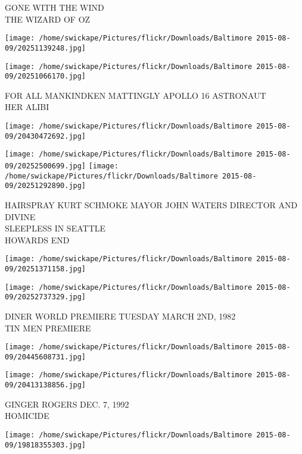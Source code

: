 \documentclass[10pt,letterpaper]{article}
\begin{document}
GONE WITH THE WIND\\
THE WIZARD OF OZ\\
\pagebreak

\texttt{[image: /home/swickape/Pictures/flickr/Downloads/Baltimore 2015-08-09/20251139248.jpg]}

\vspace{0.25in}
\texttt{[image: /home/swickape/Pictures/flickr/Downloads/Baltimore 2015-08-09/20251066170.jpg]}

FOR ALL MANKINDKEN MATTINGLY APOLLO 16 ASTRONAUT\\
HER ALIBI\\
\pagebreak

\texttt{[image: /home/swickape/Pictures/flickr/Downloads/Baltimore 2015-08-09/20430472692.jpg]}

\vspace{0.25in}
\texttt{[image: /home/swickape/Pictures/flickr/Downloads/Baltimore 2015-08-09/20252500699.jpg]}
\texttt{[image: /home/swickape/Pictures/flickr/Downloads/Baltimore 2015-08-09/20251292890.jpg]}

HAIRSPRAY KURT SCHMOKE MAYOR JOHN WATERS DIRECTOR AND DIVINE\\
SLEEPLESS IN SEATTLE\\
HOWARDS END\\
\pagebreak

\texttt{[image: /home/swickape/Pictures/flickr/Downloads/Baltimore 2015-08-09/20251371158.jpg]}

\vspace{0.25in}
\texttt{[image: /home/swickape/Pictures/flickr/Downloads/Baltimore 2015-08-09/20252737329.jpg]}

DINER WORLD PREMIERE TUESDAY MARCH 2ND, 1982\\
TIN MEN PREMIERE\\
\pagebreak

\texttt{[image: /home/swickape/Pictures/flickr/Downloads/Baltimore 2015-08-09/20445608731.jpg]}

\vspace{0.25in}
\texttt{[image: /home/swickape/Pictures/flickr/Downloads/Baltimore 2015-08-09/20413138856.jpg]}

GINGER ROGERS DEC. 7, 1992\\
HOMICIDE\\
\pagebreak

\texttt{[image: /home/swickape/Pictures/flickr/Downloads/Baltimore 2015-08-09/19818355303.jpg]}
\end{document}

